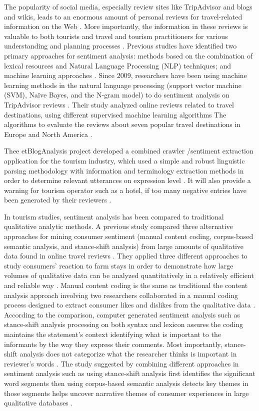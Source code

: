 \documentclass[sigconf]{acmart}
\begin{document}
The popularity of social media, especially review sites like TripAdvisor and blogs and wikis, leads to an enormous amount of personal reviews for travel-related information on the Web \cite{opinion2014}. More importantly, the information in these reviews is valuable to both tourists and travel and tourism practitioners for various understanding and planning processes \cite{YE20096527}. Previous studies have identified two primary approaches for sentiment analysis: methods based on the combination of lexical resources and Natural Language Processing (NLP) techniques; and machine learning approaches \cite{Garcia2012}. Since 2009, researchers have been using machine learning methods in the natural language processing (support vector machine (SVM), Naïve Bayes, and the N-gram model) to do sentiment analysis on TripAdvisor reviews \cite{YE20096527}. 
Their study analyzed online reviews related to travel destinations, using different supervised machine learning algorithms The
algorithms to evaluate the reviews about seven popular travel destinations in Europe and North America \cite{YE20096527}.

Thee etBlogAnalysis project developed a combined crawler /sentiment extraction application for the tourism industry, which used a simple and robust linguistic parsing methodology with information and terminology extraction methods in order to determine relevant utterances on expression level \cite{opinion2014}. It will also provide a warning for tourism operator such as a hotel, if too many negative entries have been generated by their reviewers \cite{Garcia2012}.

In tourism studies, sentiment analysis has been compared to traditional qualitative analytic methods. A previous study compared three alternative approaches for mining consumer sentiment (manual content coding, corpus-based semantic analysis, and stance-shift analysis) from large amounts of qualitative data found in online travel reviews \cite{Farm}. They applied three different approaches to study consumers' reaction to farm stays in order to demonstrate how large volumes of qualitative data can be analyzed quantitatively in a relatively efficient and reliable way \cite{Farm}.  Manual content coding is the same as traditional the content analysis approach involving two researchers collaborated in a manual coding process designed to extract consumer likes and dislikes from the qualitative data \cite{Farm}. According to the comparison, computer generated sentiment analysis such as stance-shift analysis processing on both syntax and lexicon assures the coding maintains the statement's context identifying what is important to the informants by the way they express their comments. Most importantly, stance-shift analysis does not categorize what the researcher thinks is important in reviewer's words \cite{Farm}. The study suggested by combining different approaches in sentiment analysis such as using stance-shift analysis first identifies the significant word segments then using corpus-based semantic analysis detects key themes in those segments helps uncover narrative themes of consumer experiences in large qualitative databases \cite{Farm}.
\end{document}

